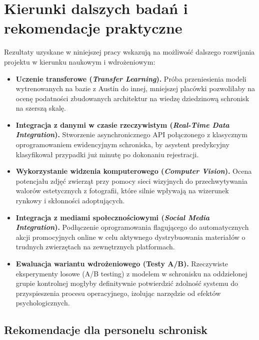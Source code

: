 \section{Kierunki dalszych badań i rekomendacje praktyczne}
\label{sec:kierunki-dalszych-badan-future-work}

Rezultaty uzyskane w niniejszej pracy wskazują na możliwość dalszego rozwijania projektu w kierunku naukowym i wdrożeniowym:

\begin{itemize}
    \item \textbf{Uczenie transferowe (\emph{Transfer Learning}).} Próba przeniesienia modeli wytrenowanych na bazie z Austin do innej, mniejszej placówki pozwoliłaby na ocenę podatności zbudowanych architektur na wiedzę dziedzinową schronisk na szerszą skalę.
    \item \textbf{Integracja z danymi w czasie rzeczywistym (\emph{Real-Time Data Integration}).} Stworzenie asynchronicznego API połączonego z klasycznym oprogramowaniem ewidencyjnym schroniska, by asystent predykcyjny klasyfikował przypadki już minutę po dokonaniu rejestracji.
    \item \textbf{Wykorzystanie widzenia komputerowego (\emph{Computer Vision}).} Ocena potencjału zdjęć zwierząt przy pomocy sieci wizyjnych do przechwytywania walorów estetycznych z fotografii, które silnie wpływają na wizerunek rynkowy i skłonności adoptujących.
    \item \textbf{Integracja z mediami społecznościowymi (\emph{Social Media Integration}).} Podłączenie oprogramowania flagującego do automatycznych akcji promocyjnych online w celu aktywnego dystrybuowania materiałów o trudnych zwierzętach na zewnętrznych platformach.
    \item \textbf{Ewaluacja wariantu wdrożeniowego (Testy A/B).} Rzeczywiste eksperymenty losowe (A/B testing) z modelem w schronisku na oddzielonej grupie kontrolnej mogłyby definitywnie potwierdzić zdolność systemu do przyspieszenia procesu operacyjnego, izolując narzędzie od efektów psychologicznych.
\end{itemize}

\subsection{Rekomendacje dla personelu schronisk}

